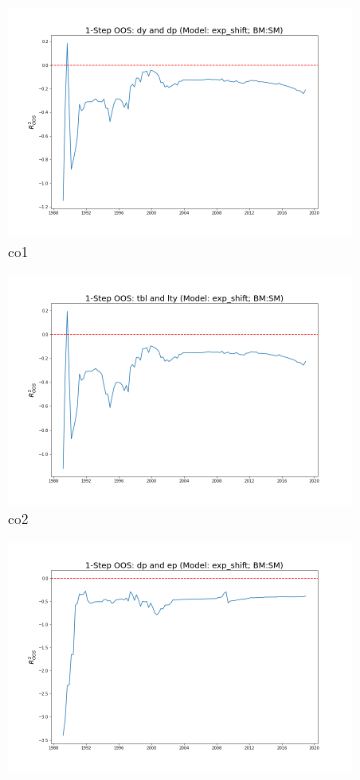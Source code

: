 \documentclass[a4paper,12pt,times,numbered,print,index]{report}
\numberwithin{equation}{section}
\begin{document}
	
	\begin{figure}[!htbp]
		\centering
		\caption{OOS Results for Model with $f_5$}
		\begin{subfigure}[b]{0.42\linewidth}
			\includegraphics[width=0.9\linewidth]{OOS_plots/exp_shift_co1_SM.png}
			\caption{co1}
		\end{subfigure}
		\begin{subfigure}[b]{0.42\linewidth}
			\includegraphics[width=0.9\linewidth]{OOS_plots/exp_shift_co2_SM.png}
			\caption{co2}
		\end{subfigure}
		\begin{subfigure}[b]{0.42\linewidth}
			\includegraphics[width=0.9\linewidth]{OOS_plots/exp_shift_co3_SM.png}

\end{subfigure}
\end{figure}
\end{document}

